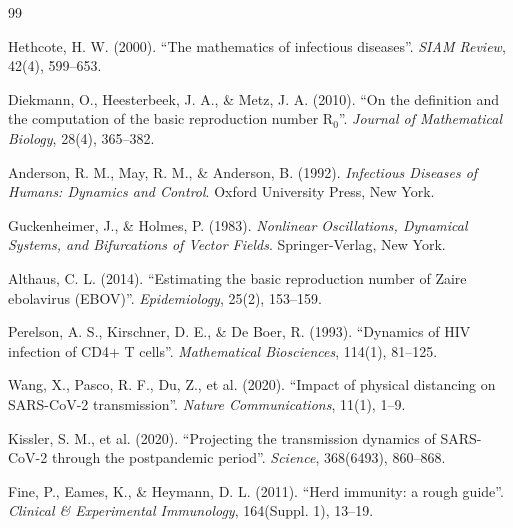 ﻿\documentclass[a4paper,12pt,twoside]{article}
\theoremstyle{definition}
\begin{document}
\begin{thebibliography}{99}

Hethcote, H. W. (2000).
``The mathematics of infectious diseases''.
\textit{SIAM Review}, 42(4), 599--653.

Diekmann, O., Heesterbeek, J. A., \& Metz, J. A. (2010).
``On the definition and the computation of the basic reproduction number R$_0$''.
\textit{Journal of Mathematical Biology}, 28(4), 365--382.

Anderson, R. M., May, R. M., \& Anderson, B. (1992).
\textit{Infectious Diseases of Humans: Dynamics and Control}.
Oxford University Press, New York.

Guckenheimer, J., \& Holmes, P. (1983).
\textit{Nonlinear Oscillations, Dynamical Systems, and Bifurcations of Vector Fields}.
Springer-Verlag, New York.

Althaus, C. L. (2014).
``Estimating the basic reproduction number of Zaire ebolavirus (EBOV)''.
\textit{Epidemiology}, 25(2), 153--159.

Perelson, A. S., Kirschner, D. E., \& De Boer, R. (1993).
``Dynamics of HIV infection of CD4+ T cells''.
\textit{Mathematical Biosciences}, 114(1), 81--125.

Wang, X., Pasco, R. F., Du, Z., et al. (2020).
``Impact of physical distancing on SARS-CoV-2 transmission''.
\textit{Nature Communications}, 11(1), 1--9.

Kissler, S. M., et al. (2020).
``Projecting the transmission dynamics of SARS-CoV-2 through the postpandemic period''.
\textit{Science}, 368(6493), 860--868.

Fine, P., Eames, K., \& Heymann, D. L. (2011).
``Herd immunity: a rough guide''.
\textit{Clinical \& Experimental Immunology}, 164(Suppl. 1), 13--19.

\end{thebibliography}
\end{document}
